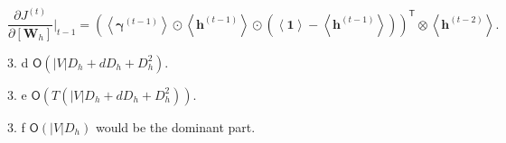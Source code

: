 \documentclass[twoside]{article}
\begin{document}
\begin{equation*}
	\frac{\partial J^{(t)}}{\partial\left[\bm{W}_h\right]}\bigg\rvert_{t-1} = \left(\left<\bm{\gamma}^{(t-1)}\right>\odot\left<\bm{h}^{(t-1)}\right>\odot\left(\left<\bm{1}\right>-\left<\bm{h}^{(t-1)}\right>\right)\right)^\mathsf{T}\otimes\left<\bm{h}^{(t-2)}\right>.
\end{equation*}

3. d $\mathsf{O}\left(\left|V\right|D_h + dD_h + D_h^2\right)$.

3. e $\mathsf{O}\left(T\left(\left|V\right|D_h + dD_h + D_h^2\right)\right)$.

3. f $\mathsf{O}\left(\left|V\right|D_h\right)$ would be the dominant part.
\end{document}
